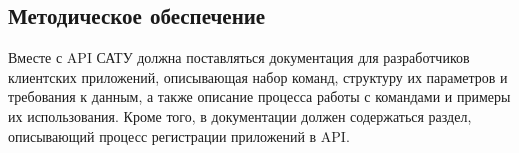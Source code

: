 \subsection{\enskip Методическое обеспечение}

\par

	Вместе с API САТУ должна поставляться документация для разработчиков клиентских приложений, описывающая набор команд, структуру их параметров и требования к данным, а также описание процесса работы с командами и примеры их использования. Кроме того, в документации должен содержаться раздел, описывающий процесс регистрации приложений в API.

